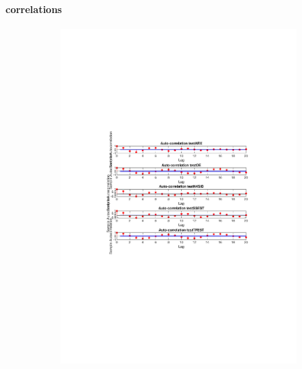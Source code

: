\documentclass[]{article}
\begin{document}
\paragraph{correlations}
\begin{figure}[ht]
\centering
\begin{subfigure}{.49\textwidth}
	\centering
	\includegraphics[trim= 10cm 8cm 10cm 8cm, scale=0.4]{figures/auto-corr-1step.pdf}
\end{subfigure}
\begin{subfigure}{.49\textwidth}
	\centering

\end{subfigure}
\end{figure}
\end{document}
